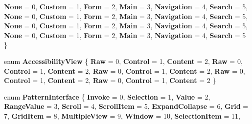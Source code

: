 \begin{DoxyCompactItemize}
{\bfseries None} = 0, 
{\bfseries Custom} = 1, 
\newline
{\bfseries Form} = 2, 
{\bfseries Main} = 3, 
{\bfseries Navigation} = 4, 
{\bfseries Search} = 5, 
\newline
{\bfseries None} = 0, 
{\bfseries Custom} = 1, 
{\bfseries Form} = 2, 
{\bfseries Main} = 3, 
\newline
{\bfseries Navigation} = 4, 
{\bfseries Search} = 5, 
{\bfseries None} = 0, 
{\bfseries Custom} = 1, 
\newline
{\bfseries Form} = 2, 
{\bfseries Main} = 3, 
{\bfseries Navigation} = 4, 
{\bfseries Search} = 5, 
\newline
{\bfseries None} = 0, 
{\bfseries Custom} = 1, 
{\bfseries Form} = 2, 
{\bfseries Main} = 3, 
\newline
{\bfseries Navigation} = 4, 
{\bfseries Search} = 5
 \}
\item 
\mbox{\label{namespace_windows_1_1_u_i_1_1_xaml_1_1_automation_1_1_peers_aaf97ef41301cdde06f4cd3f8213a5478}} 
enum {\bfseries Accessibility\+View} \{ \newline
{\bfseries Raw} = 0, 
{\bfseries Control} = 1, 
{\bfseries Content} = 2, 
{\bfseries Raw} = 0, 
\newline
{\bfseries Control} = 1, 
{\bfseries Content} = 2, 
{\bfseries Raw} = 0, 
{\bfseries Control} = 1, 
\newline
{\bfseries Content} = 2, 
{\bfseries Raw} = 0, 
{\bfseries Control} = 1, 
{\bfseries Content} = 2, 
\newline
{\bfseries Raw} = 0, 
{\bfseries Control} = 1, 
{\bfseries Content} = 2
 \}
\item 
\mbox{\label{namespace_windows_1_1_u_i_1_1_xaml_1_1_automation_1_1_peers_a4cd1632dc1195eae46e115d12298a6a7}} 
enum {\bfseries Pattern\+Interface} \{ \newline
{\bfseries Invoke} = 0, 
{\bfseries Selection} = 1, 
{\bfseries Value} = 2, 
{\bfseries Range\+Value} = 3, 
\newline
{\bfseries Scroll} = 4, 
{\bfseries Scroll\+Item} = 5, 
{\bfseries Expand\+Collapse} = 6, 
{\bfseries Grid} = 7, 
\newline
{\bfseries Grid\+Item} = 8, 
{\bfseries Multiple\+View} = 9, 
{\bfseries Window} = 10, 
{\bfseries Selection\+Item} = 11, 
\newline

\end{DoxyCompactItemize}
